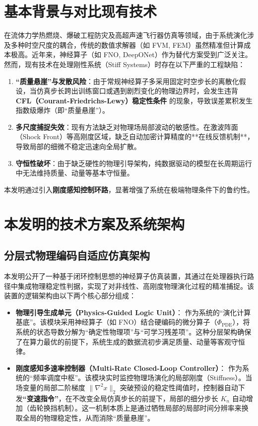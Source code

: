 \documentclass[UTF8, fontset=mac]{ctexart}
\begin{document}
\section{基本背景与对比现有技术}
在流体力学热燃烧、爆破工程防灾及高超声速飞行器仿真等领域，由于系统演化涉及多种时空尺度的耦合，传统的数值求解器（如 FVM, FEM）虽然精准但计算成本极高。近年来，神经算子（如 FNO, DeepONet）作为替代方案受到广泛关注。然而，现有技术在处理刚性系统（Stiff Systems）时存在以下严重的工程缺陷：
\begin{enumerate}
    \item \textbf{“质量悬崖”与发散风险}：由于常规神经算子多采用固定时空步长的离散化假设，当仿真步长跨出训练窗口或遇到剧烈变化的物理边界时，会发生违背 \textbf{CFL（Courant-Friedrichs-Lewy）稳定性条件} 的现象，导致误差累积发生指数级爆炸（即“质量悬崖”）。
    \item \textbf{多尺度捕捉失效}：现有方法缺乏对物理场局部波动的敏感性。在激波阵面（Shock Front）等高刚度区域，缺乏自动加密计算精度的**在线反馈机制**，导致局部的细微不稳定迅速向全局扩散。
    \item \textbf{守恒性破坏}：由于缺乏硬性的物理引导架构，纯数据驱动的模型在长周期运行中无法维持质量、动量等基本守恒量。
\end{enumerate}
本发明通过引入\textbf{刚度感知控制环路}，显著增强了系统在极端物理条件下的鲁约性。

\section{本发明的技术方案及系统架构}

\subsection{分层式物理编码自适应仿真架构}
本发明公开了一种基于闭环控制思想的神经算子仿真装置，其通过在处理器执行路径中集成物理稳定性判据，实现了对非线性、高刚度物理演化过程的精准捕捉。该装置的逻辑架构由以下两个核心部分组成：

\begin{itemize}
    \item \textbf{物理引导生成单元（Physics-Guided Logic Unit）}：
    作为系统的“演化计算基底”。该模块采用神经算子（如 FNO）结合硬编码的微分算子（$\Phi_{\text{PDE}}$），将系统的状态导数分解为“确定性物理项”与“可学习残差项”。这种分层架构确保了在算力最优的前提下，系统生成的数据流初步满足质量、动量等客观守恒律。
    
    \item \textbf{刚度感知多速率控制器（Multi-Rate Closed-Loop Controller）}：
    作为系统的“频率调度中枢”。该模块实时监控物理场演化的局部刚度（Stiffness）。当场变量的局部二阶梯度 $\|\nabla^2 x\|_2$ 突破预设的稳定性阈值时，控制器自动下发\textbf{“变速指令”}，在不改变全局仿真步长的前提下，局部的细分步长 $K_n$ 自动增加（齿轮换挡机制）。这一机制本质上是通过牺牲局部的局部时间分辨率来换取全局的物理稳定性，从而消除“质量悬崖”。
\end{itemize}
\end{document}

